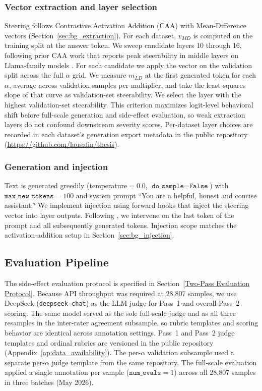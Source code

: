 \subsubsection{Vector extraction and layer selection}
Steering follows Contrastive Activation Addition (CAA) with Mean-Difference vectors (Section~\ref{sec:bg_extraction}).
For each dataset, $v_{MD}$ is computed on the training split at the answer token.
We sweep candidate layers 10 through 16, following prior CAA work that reports peak steerability in middle layers on Llama-family models \citep{rimskySteeringLlama22024}.
For each candidate we apply the vector on the validation split across the full $\alpha$ grid.
We measure $m_{LD}$ at the first generated token for each $\alpha$, average across validation samples per multiplier, and take the least-squares slope of that curve as validation-set steerability.
We select the layer with the highest validation-set steerability.
This criterion maximizes logit-level behavioral shift before full-scale generation and side-effect evaluation, so weak extraction layers do not confound downstream severity scores.
Per-dataset layer choices are recorded in each dataset's generation export metadata in the public repository (\url{https://github.com/lausafin/thesis}).

\subsubsection{Generation and injection}\label{practical injection}
Text is generated greedily ($\text{temperature}=0.0$, $\texttt{do\_sample}=\texttt{False}$) with $\texttt{max\_new\_tokens}=100$ and system prompt ``You are a helpful, honest and concise assistant.''
We implement injection using forward hooks that inject the steering vector into layer outputs.
Following \citet{tanAnalysingGeneralisationReliability2024}, we intervene on the last token of the prompt and all subsequently generated tokens.
Injection scope matches the activation-addition setup in Section~\ref{sec:bg_injection}.

\subsection{Evaluation Pipeline}
The side-effect evaluation protocol is specified in Section~\ref{Two-Pass Evaluation Protocol}.
Because API throughput was required at 28{,}807 samples, we use DeepSeek (\texttt{deepseek-chat}) as the LLM judge for Pass~1 and overall Pass~2 scoring.
The same model served as the sole full-scale judge and as all three resamples in the inter-rater agreement subsample, so rubric templates and scoring behavior are identical across annotation settings.
Pass~1 and Pass~2 judge templates and ordinal rubrics are versioned in the public repository (Appendix~\ref{ap:data_availability}).
The per-$\alpha$ validation subsample used a separate per-$\alpha$ judge template from the same repository.
The full-scale evaluation applied a single annotation per sample ($\texttt{num\_evals}=1$) across all 28{,}807 samples in three batches (May 2026).

